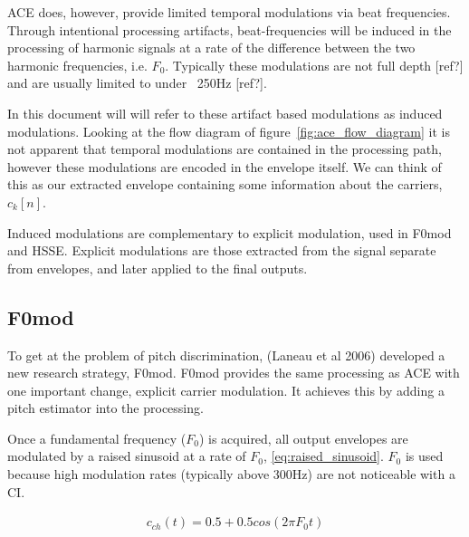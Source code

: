 \documentclass [11pt, proquest,oneside] {ganter_thesis}[2015/03/03]
\begin{document}

ACE does, however, provide limited temporal modulations via beat frequencies.  Through intentional processing artifacts, beat-frequencies will be induced in the processing of harmonic signals at a rate of the difference between the two harmonic frequencies, i.e. $F_0$.  Typically these modulations are not full depth [ref?] and are usually limited to under ~250Hz [ref?].

In this document will will refer to these artifact based modulations as induced modulations.  Looking at the flow diagram of figure~\ref{fig:ace_flow_diagram} it is not apparent that temporal modulations are contained in the processing path, however these modulations are encoded in the envelope itself.  We can think of this as our extracted envelope containing some information about the carriers, $c_k[n]$.

Induced modulations are complementary to explicit modulation, used in F0mod and HSSE.  Explicit modulations are those extracted from the signal separate from envelopes, and later applied to the final outputs.

\subsection{F0mod}

To get at the problem of pitch discrimination, (Laneau et al 2006) developed a new research strategy, F0mod.  F0mod provides the same processing as ACE with one important change, explicit carrier modulation.  It achieves this by adding a pitch estimator into the processing.

Once a fundamental frequency ($F_0$) is acquired, all output envelopes are modulated by a raised sinusoid at a rate of $F_0$, \ref{eq:raised_sinusoid}.  $F_0$ is used because high modulation rates (typically above 300Hz) are not noticeable with a CI.

\begin{align}
\label{eq:raised_sinusoid}
c_{ch}(t) = 0.5 + 0.5cos(2\pi F_0t)
\end{align}
\end{document}
